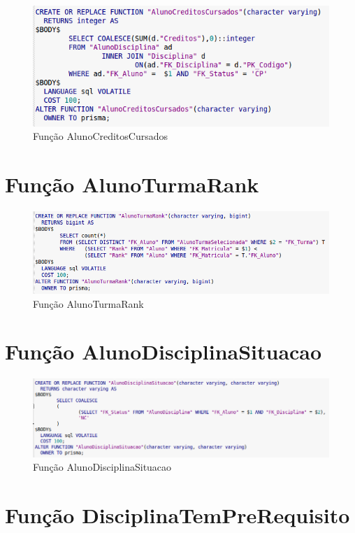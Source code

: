 \documentclass[graduacao,brazil]{ThesisPUC}
\begin{document}
\begin{figure}[H]
    \centering
    \includegraphics[width=0.7\linewidth]{img/v3_func_alunocreditoscursados.png}
    \caption{Função AlunoCreditosCursados}
\end{figure}

\section{Função AlunoTurmaRank}

\begin{figure}[H]
    \centering
    \includegraphics[width=0.9\linewidth]{img/v3_func_alunorank.png}
    \caption{Função AlunoTurmaRank}
\end{figure}


\section{Função AlunoDisciplinaSituacao}

\begin{figure}[H]
    \centering
    \includegraphics[width=\linewidth]{img/v3_func_alunosituacao.png}
    \caption{Função AlunoDisciplinaSituacao}
\end{figure}

\section{Função DisciplinaTemPreRequisito}
\end{document}
